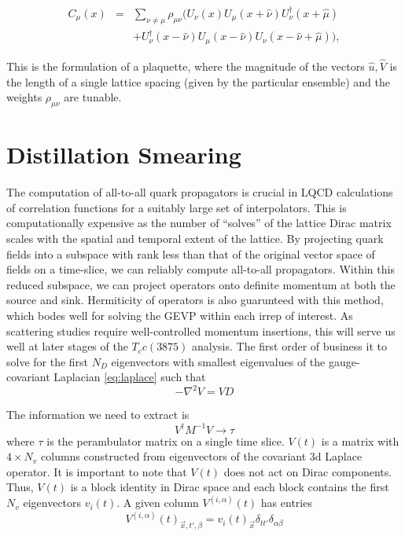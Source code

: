 \begin{eqnarray}
 C_\mu(x)&=&\sum_{\nu\neq \mu}\rho_{\mu\nu}\biggl(
 U_\nu(x) U_\mu(x\!+\!\hat{\nu}) U_\nu^\dagger(x\!+\!\hat{\mu})\nonumber\\
&&+ U^\dagger_\nu(x\!-\!\hat{\nu}) U_\mu(x\!-\!\hat{\nu})
  U_\nu(x\!-\!\hat{\nu}\!+\!\hat{\mu})
\biggr), \label{eq:Cdef}
\end{eqnarray}

This is the formulation of a plaquette, where the magnitude of the vectors $\hat{u}, \hat{V}$ is the length of a single lattice spacing (given by the particular ensemble) and the weights $\rho_{\mu\nu}$ are tunable. 

\section{Distillation Smearing}
The computation of all-to-all quark propagators is crucial in LQCD calculations of correlation functions for a suitably large set of interpolators. This is computationally expensive as the number of ``solves'' of the lattice Dirac matrix scales with the spatial and temporal extent of the lattice. By projecting quark fields into a subspace with rank less than that of the original vector space of fields on a time-slice, we can reliably compute all-to-all propagators\cite{peardon_novel_2009}. Within this reduced subspace, we can project operators onto definite momentum at both the source and sink. Hermiticity of operators is also guarunteed with this method, which bodes well for solving the GEVP within each irrep of interest. As scattering studies require well-controlled momentum insertions, this will serve us well at later stages of the $T_cc(3875)$ analysis.  
The first order of business it to solve for the first $N_D$ eigenvectors with smallest eigenvalues of the gauge-covariant Laplacian \ref{eq:laplace} such that 
\begin{equation}\label{eq:eigs}
    -\nabla^2V = VD
\end{equation} 

The information we need to extract is 
$$ V^{\dagger}M^{-1}V \rightarrow \tau $$ 
where $\tau$ is the perambulator matrix on a single time slice. 
$V(t)$ is a matrix with $4 \times N_v $  columns constructed from eigenvectors of the covariant 3d Laplace operator. It is important to note that $V(t)$ does not act on Dirac components. Thus, $V(t)$ is a block identity in Dirac space and each block contains the first $N_v$ eigenvectors $v_i(t)$. A given column $V^{(i,\alpha)}(t)$ has entries 
$$ V^{(i,\alpha)}(t)_{\vec{x},t',\beta} = v_i(t)_{\vec{x}} \delta_{tt'}\delta_{\alpha\beta}$$


